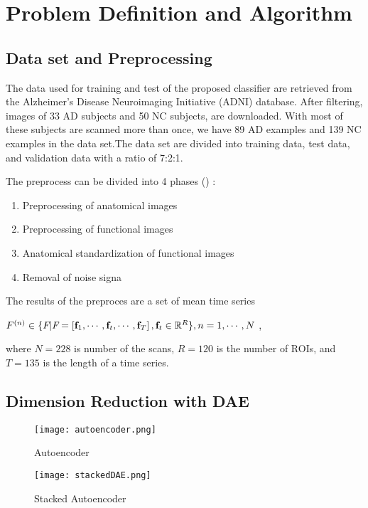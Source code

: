 \section{Problem Definition and Algorithm}

\subsection{Data set and Preprocessing}

The data used for training and test of the proposed classifier are retrieved from the Alzheimer's Disease Neuroimaging Initiative (ADNI) database. After filtering, images of 33 AD subjects and 50 NC subjects,  are downloaded. With most of these subjects are scanned more than once, we have 89 AD examples and 139 NC examples in the data set.The data set are divided into training data, test data, and validation data with a ratio of 7:2:1.

The preprocess can be divided into 4 phases (\cite{suk16}) :
	\begin{enumerate}
	\item Preprocessing of anatomical images
	\item  Preprocessing of functional images
	\item Anatomical standardization of functional images
	\item Removal of noise signa
	\end{enumerate}

The results of the preproces are a set of mean time series 
\begin{center}
$ F^{(n)} \in \{ \emph{F} | \emph{F} = \left[ \textbf{f}_1, \cdots, \textbf{f}_t, \cdots, \textbf{f}_T \right],  \textbf{f}_t \in  \mathbb{R}^{R} \}, n=1,  \cdots, N$ ,
\end{center}
where $N=228$ is number of the scans, $R=120$ is the number of  ROIs, and $T=135$ is the length of a time series. 

\subsection{Dimension Reduction with DAE}

\begin{figure}[H!]
    \centering
    \texttt{[image: autoencoder.png]}
    \caption{Autoencoder}
    \label{fig:awesome_image}
\end{figure}
\begin{figure}[H!]
    \centering
    \texttt{[image: stackedDAE.png]}
    \caption{Stacked Autoencoder}
    \label{fig:awesome_image}
\end{figure}

